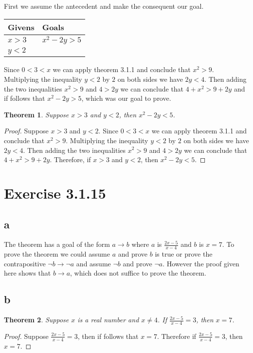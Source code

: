 \documentclass{article}
\newcommand{\n}{ \noindent }
\newtheorem*{theorem}{Theorem}  %
\begin{document}
\n First we assume the antecedent and make the consequent our goal. \\

\begin{table}[h]
\begin{tabular}{ll}
\hline
Givens & Goals   \\ \hline
$x > 3$ & $x^2 - 2y > 5$ \\
$y < 2$ &\\ \hline
\end{tabular}
\end{table}


\n Since $0<3<x$ we can apply theorem 3.1.1 and conclude that $x^2 > 9$. Multiplying the inequality $y <2$ by $2$ on both sides we have $2y<4$. Then adding the two inequalities $x^2 > 9$ and $4 > 2y$ we can conclude that $4 + x^2 > 9 + 2y$ and if follows that $x^2 - 2y > 5$, which was our goal to prove.

\begin{theorem} Suppose $x>3$ and $y<2$, then $x^2 - 2y < 5$.
\end{theorem}
\begin{proof}
Suppose $x>3$ and $y<2$. Since $0<3<x$ we can apply theorem 3.1.1 and conclude that $x^2 > 9$. Multiplying the inequality $y <2$ by $2$ on both sides we have $2y<4$. Then adding the two inequalities $x^2 > 9$ and $4 > 2y$ we can conclude that $4 + x^2 > 9 + 2y$. Therefore, if $x>3$ and $y<2$, then $x^2 - 2y < 5$.
\end{proof}

\section*{Exercise 3.1.15}
\subsection*{a}
The theorem has a goal of the form $a \rightarrow b$ where $a$ is $\tfrac{2x-5}{x-4}$ and $b$ is $x = 7$. To prove the theorem we could assume $a$ and prove $b$ is true or prove the contrapositive $\lnot b \rightarrow \lnot a$ and assume $\lnot b$ and prove $\lnot a$. However the proof given here shows that $b \rightarrow a$, which does not suffice to prove the theorem.

\subsection*{b}
\begin{theorem} Suppose $x$ is a real number and $x \neq 4$. If $\tfrac{2x-5}{x-4} = 3$, then $x=7$.
\end{theorem}
\begin{proof}
Suppose $\tfrac{2x-5}{x-4} = 3$, then if follows that $x=7$. Therefore if $\tfrac{2x-5}{x-4} = 3$, then $x = 7$.
\end{proof}
\end{document}
